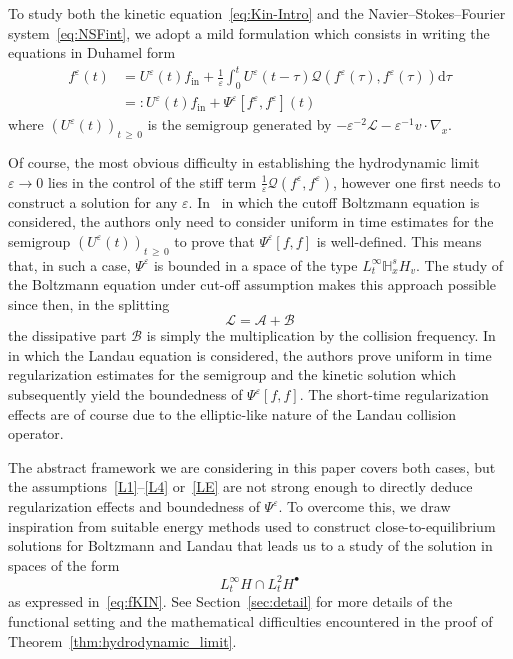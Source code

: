 \documentclass[AHL,Unicode,longabstracts,published]{cedram}
\newcommand{\ini}{\mathrm{in}}
\renewcommand{\d}{\mathrm{d}}
\newcommand{\bbH}{\mathbb{H}}
\renewcommand{\AA}{\mathcal{A}}
\newcommand{\BB}{\mathcal{B}}
\newcommand{\LL}{\mathcal{L}}
\newcommand{\QQ}{\mathcal{Q}}
\newcommand{\Ss}{H}
\newcommand{\Ssp}{H^{\bullet}}
\renewcommand*\ge{\geqslant}
\newcommand*\eps{{\varepsilon}}
\begin{document}
To study both the kinetic equation~\eqref{eq:Kin-Intro} and the Navier--Stokes--Fourier system~\eqref{eq:NSFint}, we adopt a mild formulation which consists in writing the equations in Duhamel form
\begin{align*}
f^\eps(t)&=U^\eps(t)f_\ini+\frac{1}{\eps}\int_0^t U^\eps(t-\tau) \QQ\left(f^\eps(\tau),f^\eps(\tau)\right)\d\tau\\
&=:U^\eps(t)f_\ini+\Psi^\eps\left[f^\eps,f^\eps\right](t)
\end{align*}
where $(U^\eps(t))_{t\,\ge\,0}$ is the semigroup generated by $-{\eps^{-2}}\LL - {\eps}^{-1}v\cdot \nabla_x$.

{Of course, the most obvious difficulty in establishing the hydrodynamic limit $\eps \to 0$ lies in the control of the stiff term $\frac{1}{\eps}\QQ(f^\eps,f^\eps)$, however one first needs to construct a solution for any $\eps$.} In~\cite{BU1991, GT2020} in which the cutoff Boltzmann equation is considered, the authors only need to consider uniform in time estimates for the semigroup $(U^\eps(t))_{t\,\ge\,0}$ to prove that $\Psi^\eps[f,f]$ is well-defined. This means that, in such a case, $\Psi^\eps$ is bounded in a space of the type $L^\infty_t\bbH^s_x \Ss_v$. The study of the Boltzmann equation under cut-off assumption makes this approach possible since then, in the splitting
\[
\LL=\AA+\BB
\]
the dissipative part $\BB$ is simply the multiplication by the collision frequency. In~\cite{CRT2022} in which the Landau equation is considered, the authors prove uniform in time regularization estimates for the semigroup and the kinetic solution which subsequently yield the boundedness of $\Psi^\eps[f,f].$ The short-time regularization effects are of course due to the elliptic-like nature of the Landau collision operator.

The abstract framework we are considering in this paper covers both cases, but the assumptions~\eqref{L1}--\eqref{L4} or~\ref{LE} are not strong enough to directly deduce regularization effects and boundedness of $\Psi^\eps$. To overcome this, we draw inspiration from suitable energy methods used to construct close-to-equilibrium solutions for Boltzmann and Landau that leads us to a study of the solution in spaces of the form
\[
L^\infty_t \Ss \cap L^2_t \Ssp
\]
as expressed in~\eqref{eq:fKIN}. See Section~\ref{sec:detail} for more details of the functional setting and the mathematical difficulties encountered in the proof of Theorem~\ref{thm:hydrodynamic_limit}.
\end{document}
